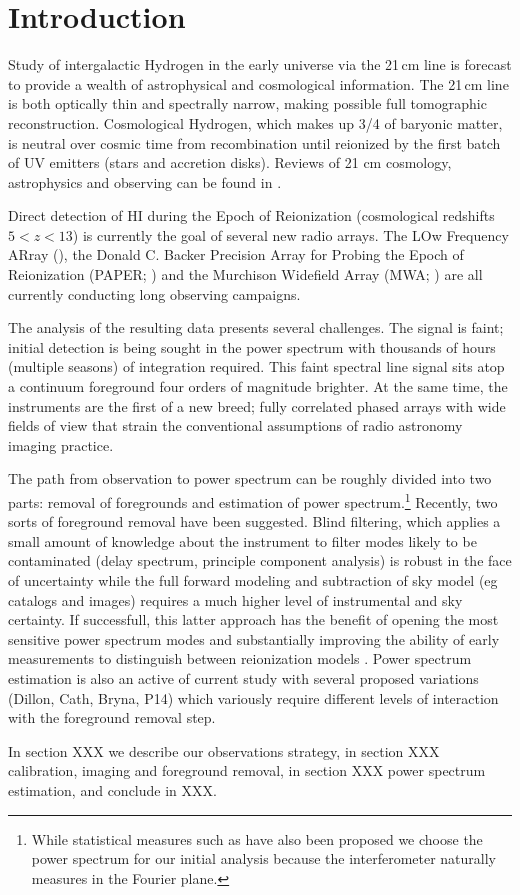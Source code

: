 \section{Introduction} 
  Study of intergalactic Hydrogen  in the early universe via the 21\,cm line is forecast to provide a wealth of astrophysical and cosmological information.  The 21\,cm line is both optically thin and spectrally narrow, making possible full tomographic reconstruction. Cosmological Hydrogen, which makes up 3/4 of baryonic matter, is neutral over cosmic time from recombination until reionized by the first batch of UV emitters (stars and accretion disks).  Reviews of 21 cm cosmology, astrophysics and observing can be found in \cite{Morales:2010p8093,Furlanetto:2006p2267,Pritchard:2012p9555,zaroubi2013epoch}.
  
Direct detection of HI during the Epoch of Reionization (cosmological redshifts $5<z<13$) is currently the goal of several new radio arrays. The LOw Frequency ARray (), the Donald C. Backer Precision Array for Probing the Epoch of Reionization (PAPER; ) and the Murchison Widefield Array (MWA; ) are all currently conducting long observing campaigns.

The analysis of the resulting data presents several challenges. The signal is faint; initial detection is being sought in the power spectrum with thousands of hours (multiple seasons) of integration required. This faint spectral line signal sits atop a continuum foreground four orders of magnitude brighter. At the same time, the instruments are the first of a new breed; fully correlated phased arrays with wide fields of view that strain the conventional assumptions of radio astronomy imaging practice. 

The path from observation to power spectrum can be roughly divided into two parts: removal of foregrounds and estimation of power spectrum.\footnote{While statistical measures  such as \citet{Barkana:2008p2154} have also been proposed we choose the power spectrum for our initial analysis because the interferometer naturally measures in the Fourier plane.} Recently, two sorts of foreground removal have been suggested. Blind filtering, which applies a small amount of knowledge about the instrument to filter modes likely to be contaminated (delay spectrum, principle component analysis) is robust in the face of uncertainty while the full forward modeling and subtraction of sky model (eg catalogs and images) requires a much higher level of instrumental and sky certainty. If successfull, this latter approach has the benefit of opening the most sensitive power spectrum modes and substantially improving the ability of early measurements to distinguish between reionization models \citep{Pober:2014p10390}.  Power spectrum estimation is also an active of current study with several proposed variations (Dillon, Cath, Bryna, P14) which variously require different levels of interaction with the foreground removal step.




In section XXX we describe our observations strategy, in section XXX calibration, imaging and foreground removal, in section XXX power spectrum estimation, and conclude in XXX.